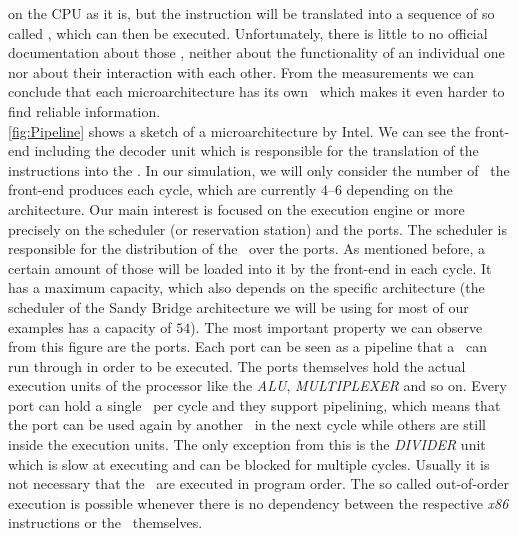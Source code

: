 on the CPU as it is, but the instruction will be translated into a sequence of so called \microops, which can then be executed. Unfortunately, there is little to no official documentation about those \microops, neither about the functionality of an individual one nor about their interaction with each other. From the measurements we can conclude that each microarchitecture has its own \microops\ which makes it even harder to find reliable information.\\ \autoref{fig:Pipeline} shows a sketch of a microarchitecture by Intel. We can see the front-end including the decoder unit which is responsible for the translation of the instructions into the \microops. In our simulation, we will only consider the number of \microops\ the front-end produces each cycle, which are currently $4$--$6$ depending on the architecture. Our main interest is focused on the execution engine or more precisely on the scheduler (or reservation station) and the ports. The scheduler is responsible for the distribution of the \microops\ over the ports. As mentioned before, a certain amount of those will be loaded into it by the front-end in each cycle. It has a maximum capacity, which also depends on the specific architecture (the scheduler of the Sandy Bridge architecture we will be using for most of our examples has a capacity of $54$). The most important property we can observe from this figure are the ports. Each port can be seen as a pipeline that a \microop\ can run through in order to be executed. The ports themselves hold the actual execution units of the processor like the \emph{ALU}, \emph{MULTIPLEXER} and so on. Every port can hold a single \microop\ per cycle and they support pipelining, which means that the port can be used again by another \microop\ in the next cycle while others are still inside the execution units. The only exception from this is the \emph{DIVIDER} unit which is slow at executing and can be blocked for multiple cycles. Usually it is not necessary that the \microops\ are executed in program order. The so called out-of-order execution is possible whenever there is no dependency between the respective \emph{x86} instructions or the \microops\ themselves.
 
 
 
 
